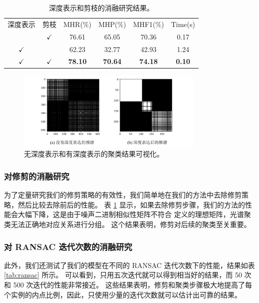 \setlength{\tabcolsep}{2pt}
\begin{table}
  \caption{
    深度表示和剪枝的消融研究结果。
    }
  \centering
  \begin{tabular}{cccccc}
    \hline\noalign{\smallskip}
    深度表示 & 剪枝 & MHR(\%)         & MHP(\%)         & MHF1(\%)         & Time(s)       \\
  \noalign{\smallskip}
  \hline
  \noalign{\smallskip}
  & $\checkmark$       & 76.61          & 65.05          & 70.36          & 0.17          \\
  $\checkmark$                   &         & 62.23          & 32.77          & 42.93          & 1.24          \\
  $\checkmark$                &
 $\checkmark$     & \textbf{78.10} & \textbf{70.64} & \textbf{74.18} & \textbf{0.10}\\
  \hline
  \end{tabular}
  \label{tab:ablation}
\end{table}
\setlength{\tabcolsep}{1.4pt}


\begin{figure}
  \centering
  \includegraphics[width=0.8\textwidth]{images/spectral.pdf}
  \caption{
    无深度表示和有深度表示的聚类结果可视化。
    }
    \vspace{-1.0cm}
  \label{fig:spectral}
\end{figure}

\subsubsection{对修剪的消融研究}
为了定量研究我们的修剪策略的有效性，我们简单地在我们的方法中去除修剪策略，然后比较去除前后的性能。
表 \ref{tab:ablation} 显示，如果去除修剪步骤，我们的方法的性能会大幅下降，这是由于噪声二进制相似性矩阵不符合 \cite{li2007noise} 定义的理想矩阵，光谱聚类无法正确地对应关系进行分组。
这个结果表明，修剪对后续的聚类至关重要。

\subsubsection{对 RANSAC 迭代次数的消融研究}
\vspace{-0.3cm}
此外，我们还测试了我们的模型在不同的 RANSAC 迭代次数下的性能，结果如表 \ref{tab:ransac} 所示。
可以看到，只用五次迭代就可以得到相当好的结果，而 50 次和 500 次迭代的性能非常接近。
这些结果表明，修剪和聚类步骤极大地提高了每个实例的内点比例，因此，只使用少量的迭代次数就可以估计出可靠的结果。


